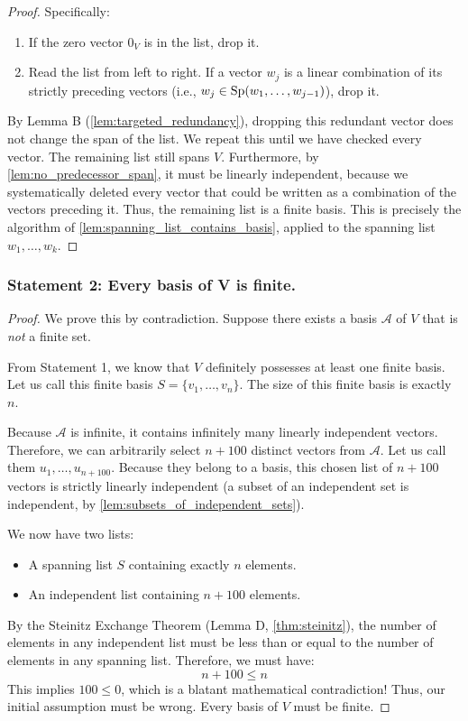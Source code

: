 \begin{proof}
Specifically:
\begin{enumerate}
    \item If the zero vector $0_V$ is in the list, drop it.
    \item Read the list from left to right. If a vector $w_j$ is a linear combination of its strictly preceding vectors (i.e., $w_j \in \operatorname{Sp}(w_1, \dots, w_{j-1})$), drop it.
\end{enumerate}
By Lemma B (\cref{lem:targeted_redundancy}), dropping this redundant vector does not change the span of the list. We repeat this until we have checked every vector. The remaining list still spans $V$. Furthermore, by \cref{lem:no_predecessor_span}, it must be linearly independent, because we systematically deleted every vector that could be written as a combination of the vectors preceding it. Thus, the remaining list is a finite basis. This is precisely the algorithm of \cref{lem:spanning_list_contains_basis}, applied to the spanning list $w_1, \dots, w_k$.
\end{proof}

\subsubsection*{Statement 2: Every basis of V is finite.}

\begin{proof}
We prove this by contradiction. Suppose there exists a basis $\mathcal{A}$ of $V$ that is \textit{not} a finite set. 

From Statement 1, we know that $V$ definitely possesses at least one finite basis. Let us call this finite basis $S = \{v_1, \dots, v_n\}$. The size of this finite basis is exactly $n$.

Because $\mathcal{A}$ is infinite, it contains infinitely many linearly independent vectors. Therefore, we can arbitrarily select $n + 100$ distinct vectors from $\mathcal{A}$. Let us call them $u_1, \dots, u_{n+100}$.
Because they belong to a basis, this chosen list of $n+100$ vectors is strictly linearly independent (a subset of an independent set is independent, by \cref{lem:subsets_of_independent_sets}).

We now have two lists:
\begin{itemize}
    \item A spanning list $S$ containing exactly $n$ elements.
    \item An independent list containing $n+100$ elements.
\end{itemize}

By the Steinitz Exchange Theorem (Lemma D, \cref{thm:steinitz}), the number of elements in any independent list must be less than or equal to the number of elements in any spanning list. Therefore, we must have:
\[
n + 100 \le n
\]
This implies $100 \le 0$, which is a blatant mathematical contradiction! Thus, our initial assumption must be wrong. Every basis of $V$ must be finite.
\end{proof}

